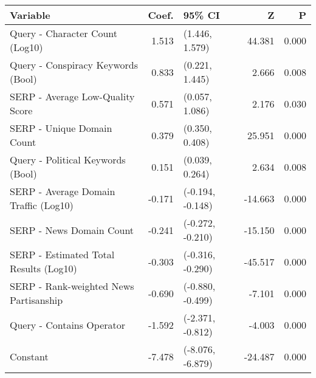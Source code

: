\begin{tabular}{>{\raggedright\arraybackslash}p{7cm}rlrr}
\toprule
\textbf{Variable} & \textbf{Coef.} & \textbf{95\% CI} & \textbf{Z} & \textbf{P} \\
\midrule
Query - Character Count (Log10) & 1.513 & (1.446, 1.579) & 44.381 & 0.000 \\
Query - Conspiracy Keywords (Bool) & 0.833 & (0.221, 1.445) & 2.666 & 0.008 \\
SERP - Average Low-Quality Score & 0.571 & (0.057, 1.086) & 2.176 & 0.030 \\
SERP - Unique Domain Count & 0.379 & (0.350, 0.408) & 25.951 & 0.000 \\
Query - Political Keywords (Bool) & 0.151 & (0.039, 0.264) & 2.634 & 0.008 \\
SERP - Average Domain Traffic (Log10) & -0.171 & (-0.194, -0.148) & -14.663 & 0.000 \\
SERP - News Domain Count & -0.241 & (-0.272, -0.210) & -15.150 & 0.000 \\
SERP - Estimated Total Results (Log10) & -0.303 & (-0.316, -0.290) & -45.517 & 0.000 \\
SERP - Rank-weighted News Partisanship & -0.690 & (-0.880, -0.499) & -7.101 & 0.000 \\
Query - Contains Operator & -1.592 & (-2.371, -0.812) & -4.003 & 0.000 \\
Constant & -7.478 & (-8.076, -6.879) & -24.487 & 0.000 \\
\bottomrule
\end{tabular}